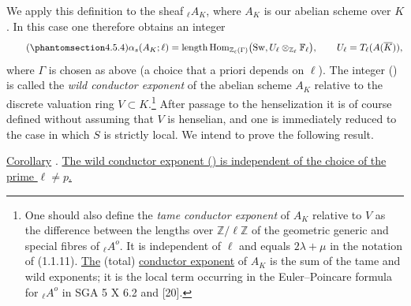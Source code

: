 We apply this definition to the sheaf ${}_\ell A_K$, where $A_K$ is our
abelian scheme over $K$.  In this case one therefore obtains an integer
\begin{equation}\tag{\SGARefTarget{sga7.sga7i.eix.n4-5-4}{4.5.4}}
 \alpha_s(A_K;\ell)
 =\operatorname{length}
   \operatorname{Hom}_{\mathbb Z_\ell(\Gamma)}
   \bigl(\operatorname{Sw},
         U_\ell\otimes_{\mathbb Z_\ell}\mathbb F_\ell\bigr),
 \qquad
 U_\ell=T_\ell(A(\overline K)),
\end{equation}
where $\Gamma$ is chosen as above (a choice that a priori depends on
$\ell$).  The integer () is called the \emph{wild conductor
exponent} of the abelian scheme $A_K$ relative to the discrete valuation
ring $V\subset K$.\footnote{One should also define the \emph{tame
conductor exponent} of $A_K$ relative to $V$ as the difference between
the lengths over $\mathbb Z/\ell\mathbb Z$ of the geometric generic and
special fibres of ${}_\ell A^o$.  It is independent of $\ell$ and equals
$2\lambda+\mu$ in the notation of (1.1.11).  \underline{The} (total) \underline{conductor
exponent} of $A_K$ is the sum of the tame and wild exponents; it is the
local term occurring in the Euler--Poincare formula for ${}_\ell A^o$ in
SGA 5 X 6.2 and [20].}  After passage to the henselization it is of
course defined without assuming that $V$ is henselian, and one is
immediately reduced to the case in which $S$ is strictly local.  We
intend to prove the following result.

\medskip
\noindent
\underline{Corollary} . \underline{The wild conductor exponent
() is independent of the choice of the prime $\ell\neq p$.}

